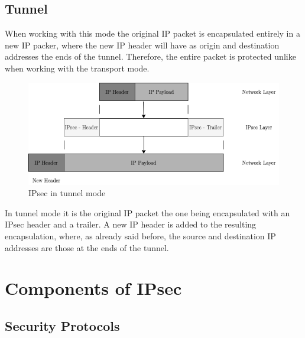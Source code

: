 \documentclass[11pt]{book}
\begin{document}
\subsection{Tunnel}
When working with this mode the original IP packet is encapsulated entirely in a new IP packer, where the new IP header will have as origin and destination addresses the ends of the tunnel. Therefore, the entire packet is protected unlike when working with the transport mode. 
\begin{figure}[H]
	\centering
	\includegraphics [scale=0.5] {tunnel_encapsulation.png}
	\caption{IPsec in tunnel mode}
\end{figure}
In tunnel mode it is the original IP packet the one being encapsulated with an IPsec header and a trailer. A new IP header is added to the resulting encapsulation, where, as already said before, the source and destination IP addresses are those at the ends of the tunnel.
\section{Components of IPsec}
\subsection{Security Protocols}
\end{document}
